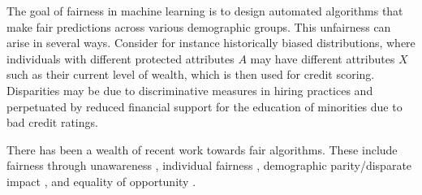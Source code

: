 The goal of fairness in machine learning is to design automated
algorithms that make fair predictions across various demographic
groups. This unfairness can arise in several ways. Consider for
instance historically biased distributions, where individuals with
different protected attributes $A$ may have different attributes
$X$ such as their current level of wealth, which is then used for
credit scoring. Disparities may be due to discriminative measures in
hiring practices and perpetuated by reduced financial support
for the education of minorities due to bad credit ratings.

There has been a wealth of recent work towards fair
algorithms. %
These include fairness through unawareness \cite{grgiccase},
individual fairness \cite{dwork2012fairness,zemel2013learning,louizos2015variational,joseph2016rawlsian},
demographic parity/disparate impact \cite{zafar2015learning}, and
equality of opportunity \cite{hardt2016equality,zafar2016fairness}.

